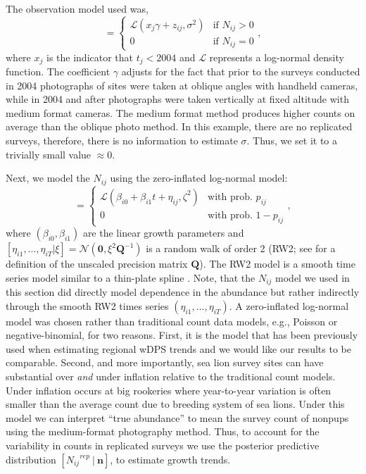 \documentclass[12pt,letter]{article}
\newcommand{\Nij}{\ensuremath{N_{ij}}}
\newcommand{\fN}{\ensuremath{\mathcal{N}}}
\begin{document}
The observation model used was,
\begin{equation}
[n_{ij}\ |\ \Nij,x_j, \gamma,\sigma] = \left\{
	\begin{array}{ll} 
	\mathcal{L}(x_j \gamma + z_{ij}, \sigma^2)& \mbox{if } N_{ij}>0\\
	0 & \mbox{if } N_{ij}=0
	\end{array}\right.,
\end{equation}
where $x_j$ is the indicator that $t_j < 2004$ and $\mathcal{L}$ represents a log-normal density function. The coefficient $\gamma$ adjusts for the fact that prior to the surveys conducted in 2004 photographs of sites were taken at oblique angles with handheld cameras, while in 2004 and after photographs were taken vertically at fixed altitude with medium format cameras. The medium format method produces higher counts on average than the oblique photo method. In this example, there are no replicated surveys, therefore, there is no information to estimate $\sigma$. Thus, we set it to a trivially small value $\approx 0$. 

Next, we model the $\Nij$ using the zero-inflated log-normal model:
\begin{equation}
[\Nij\ |\ \beta_{i0}, \beta_{i1}, \eta_{ij}] = \left\{
	\begin{array}{ll}
		\mathcal{L}(\beta_{i0} + \beta_{i1}t + \eta_{ij}, \zeta^2) & \mbox{with prob. } p_{ij}\\
		0 & \mbox{with prob. } 1-p_{ij}
	\end{array}\right.,
\end{equation}
where $(\beta_{i0},\beta_{i1})$ are the linear growth parameters and $[\eta_{i1},\dots,\eta_{iT}|\xi] = \fN(\mathbf{0},\xi^2\mathbf{Q}^{-1})$ is a random walk of order 2 (RW2; see \citealt{} for a definition of the unscaled precision matrix $\mathbf{Q}$). The RW2 model is a smooth time series model similar to a thin-plate spline \citep{Speckman:2003xa}. Note, that the $\Nij$ model we used in this section did directly model dependence in the abundance but rather indirectly through the smooth RW2 times series $(\eta_{i1},\dots,\eta_{iT})$. A zero-inflated log-normal model was chosen rather than traditional count data models, e.g., Poisson or negative-binomial, for two reasons. First, it is the model that has been previously used when estimating regional wDPS trends \citep{} and we would like our results to be comparable. Second, and more importantly, sea lion survey sites can have substantial over {\em and} under inflation relative to the traditional count models. Under inflation occurs at big rookeries where year-to-year variation is often smaller than the average count due to breeding system of sea lions. Under this model we can interpret ``true abundance'' to mean the survey count of nonpups using the medium-format photography method. Thus, to account for the variability in counts in replicated surveys we use the posterior predictive distribution $[\Nij^{rep}\ |\ \mathbf{n}]$, to estimate growth trends.  
\end{document}
